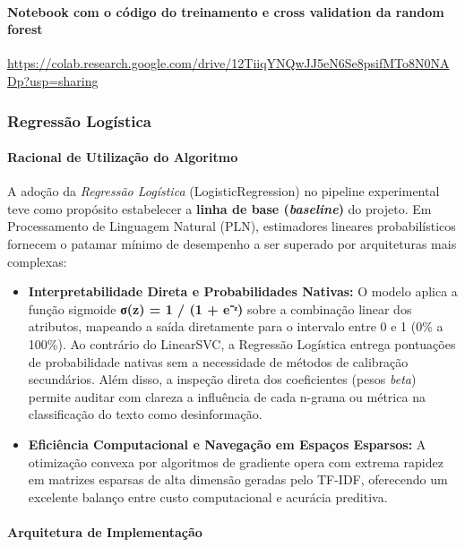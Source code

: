 \documentclass[
  brazilian,
  11pt,
]{article}
\providecommand{\tightlist}{%
  \setlength{\itemsep}{0pt}\setlength{\parskip}{0pt}}
\begin{document}
\paragraph{Notebook com o código do treinamento e cross validation da random forest}\label{notebook-com-o-cuxf3digo-do-treinamento-e-cross-validation-da-random-forest}

\url{https://colab.research.google.com/drive/12TiiqYNQwJJ5eN6Se8psifMTo8N0NADp?usp=sharing}

\subsubsection{Regressão Logística}\label{regressuxe3o-loguxedstica}

\paragraph{Racional de Utilização do Algoritmo}\label{racional-de-utilizauxe7uxe3o-do-algoritmo-1}

A adoção da \emph{Regressão Logística} (LogisticRegression) no pipeline experimental teve como propósito estabelecer a \textbf{linha de base (\emph{baseline})} do projeto. Em Processamento de Linguagem Natural (PLN), estimadores lineares probabilísticos fornecem o patamar mínimo de desempenho a ser superado por arquiteturas mais complexas:

\begin{itemize}
\tightlist
\item
  \textbf{Interpretabilidade Direta e Probabilidades Nativas:} O modelo aplica a função sigmoide \textbf{σ(z) = 1 / (1 + e⁻ᶻ)} sobre a combinação linear dos atributos, mapeando a saída diretamente para o intervalo entre 0 e 1 (0\% a 100\%). Ao contrário do LinearSVC, a Regressão Logística entrega pontuações de probabilidade nativas sem a necessidade de métodos de calibração secundários. Além disso, a inspeção direta dos coeficientes (pesos \emph{beta}) permite auditar com clareza a influência de cada n-grama ou métrica na classificação do texto como desinformação.
\item
  \textbf{Eficiência Computacional e Navegação em Espaços Esparsos:} A otimização convexa por algoritmos de gradiente opera com extrema rapidez em matrizes esparsas de alta dimensão geradas pelo TF-IDF, oferecendo um excelente balanço entre custo computacional e acurácia preditiva.
\end{itemize}

\paragraph{Arquitetura de Implementação}\label{arquitetura-de-implementauxe7uxe3o-2}
\end{document}
